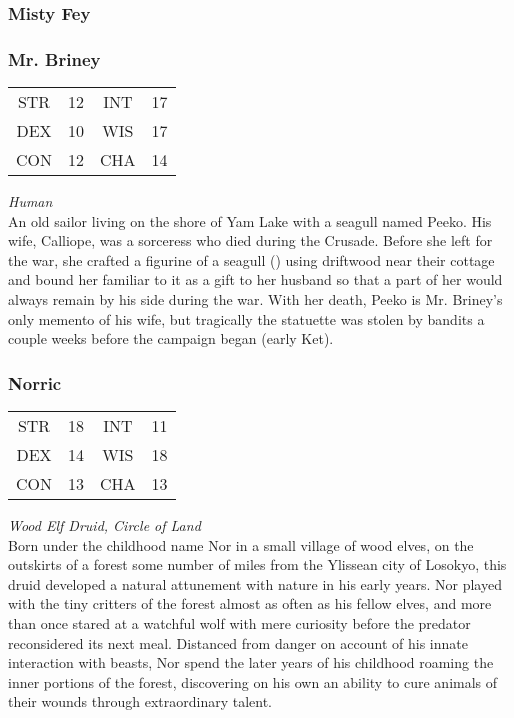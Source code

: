 \subsubsection{Misty Fey}
\label{people:mistyfey}

\subsubsection{Mr. Briney}
\label{people:mrbriney}
\begin{center}
\begin{tabular}{c c|c c}
STR & 12 & INT & 17\\
DEX & 10 & WIS & 17 \\
CON & 12 & CHA & 14 \end{tabular}\end{center}
\textit{Human}\\
An old sailor living on the shore of Yam Lake with a seagull named Peeko. His wife, Calliope, was a sorceress who died during the Crusade. Before she left for the war, she crafted a figurine of a seagull () using driftwood near their cottage and bound her familiar to it as a gift to her husband so that a part of her would always remain by his side during the war. With her death, Peeko is Mr. Briney's only memento of his wife, but tragically the statuette was stolen by bandits a couple weeks before the campaign began (early Ket). 


\subsubsection{Norric}
\label{people:jeff}
\begin{center}
\begin{tabular}{c c|c c}
STR & 18 & INT & 11\\
DEX & 14 & WIS & 18 \\
CON & 13 & CHA & 13 \end{tabular}\end{center}
\textit{Wood Elf Druid, Circle of Land}\\

Born under the childhood name Nor in a small village of wood elves, on the outskirts of a forest some number of miles from the Ylissean city of Losokyo, this druid developed a natural attunement with nature in his early years. Nor played with the tiny critters of the forest almost as often as his fellow elves, and more than once stared at a watchful wolf with mere curiosity before the predator reconsidered its next meal. Distanced from danger on account of his innate interaction with beasts, Nor spend the later years of his childhood roaming the inner portions of the forest, discovering on his own an ability to cure animals of their wounds through extraordinary talent. 

